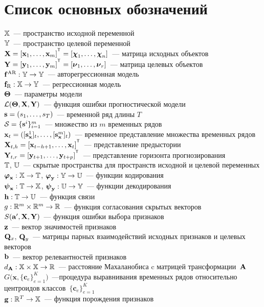 \chapter*{Список основных обозначений}
\noindent 
$\mathbb{X}$~--- пространство исходной переменной \\
$\mathbb{Y}$~--- пространство целевой переменной \\
$\bX = [\bx_1, \dots, \bx_m]^{\T} =  [\bchi_1, \dots, \bchi_n]$~--- матрица исходных объектов \\
$\bY = [\by_1, \dots, \by_m]^{\T} =  [\bnu_1, \dots, \bnu_r]$~--- матрица целевых объектов \\
$\mathbf{f}^{\text{AR}}: \mathbb{Y} \rightarrow \mathbb{Y}$~--- авторегрессионная модель \\
$\mathbf{f}_{\text{R}}: \mathbb{X} \rightarrow \mathbb{Y}$~--- регрессионная модель \\
$\boldsymbol{\Theta}$~--- параметры модели \\
$\mathcal{L}(\boldsymbol{\Theta}, \mathbf{X}, \mathbf{Y})$~--- функция ошибки прогностической модели \\
$\mathbf{s} = (s_1, \dots, s_T)$~--- временной ряд длины $T$ \\
$\mathcal{S} = \{\mathbf{s}^i\}_{i=1}^m$~--- множество из $m$ временных рядов \\
$\mathbf{x}_t = ([\mathbf{s}_{\mathbf{x}}^1]_t, \dots, [\mathbf{s}_{\mathbf{x}}^m]_t)$~--- временное представление множества временных рядов \\
$\bX_{t,h} = [\bx_{t - h + 1}, \dots, \bx_{t}]^{\T}$~--- представление предыстории \\
$\bY_{t,r} = [\by_{t + 1}, \dots, \by_{t + p}]^{\T}$~--- представление горизонта прогнозирования \\
$\mathbb{T}$, $\mathbb{U}$~--- скрытые пространства для пространств исходной и целевой переменных \\
$\boldsymbol{\varphi}_{\mathbf{x}}: \mathbb{X} \rightarrow \mathbb{T}$, $\boldsymbol{\varphi}_{\mathbf{y}}: \mathbb{Y} \rightarrow \mathbb{U}$~--- функции кодирования \\
$\boldsymbol{\psi}_{\mathbf{x}}: \mathbb{T} \rightarrow \mathbb{X}$, $\boldsymbol{\psi}_{\mathbf{y}}: \mathbb{U} \rightarrow \mathbb{Y}$~--- функции декодирования \\
$\mathbf{h}: \mathbb{T}\rightarrow \mathbb{U}$~--- функция связи \\
$g: \mathbb{R}^m \times \mathbb{R}^m \rightarrow \mathbb{R}$~--- функция согласования скрытых векторов \\
$S(\mathbf{a}', \mathbf{X}, \mathbf{Y})$~--- функция ошибки выбора признаков \\
$\mathbf{z}$~--- вектор значимостей признаков \\
$\mathbf{Q}_x$, $\mathbf{Q}_y$~--- матрицы парных взаимодействий исходных признаков и целевых векторов \\
$\mathbf{b}$~--- вектор релевантностей признаков \\
$d_{\mathbf{A}}: \mathbb{X} \times \mathbb{X} \rightarrow \mathbb{R}$~--- расстояние Махаланобиса c матрицей	трансформации~$\mathbf{A}$ \\
$G\bigl(\mathbf{x}, \{\mathbf{c}_e\}_{e = 1} ^ K\bigr)$~---процедура выравнивания временных рядов относительно центроидов классов~$\{\mathbf{c}_e\}_{e = 1} ^ K$ \\
$\mathbf{g}: \mathbb{R}^T \rightarrow \mathbb{X}$~--- функция порождения признаков